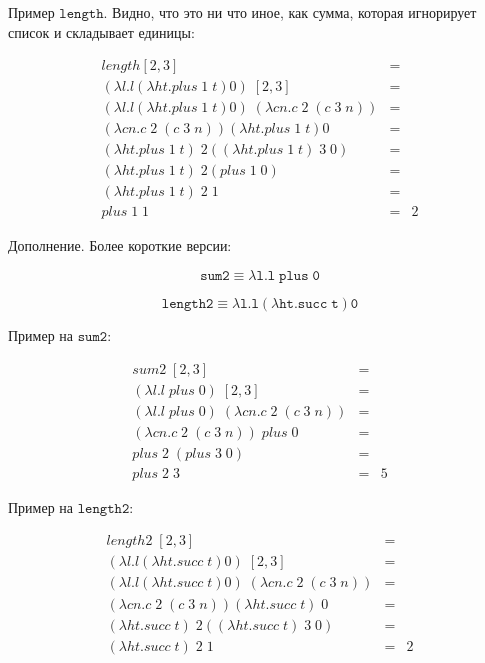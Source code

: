 \documentclass[russian]{article}
\begin{document}
Пример $\mathtt{length}$. Видно, что это ни что иное, как сумма, которая игнорирует список и складывает единицы:

\begin{eqnarray*}
length [2, 3] & =\\
(\lambda l.l(\lambda ht.plus\; 1\; t)0)\; [2, 3] &=\\
(\lambda l.l(\lambda ht.plus\; 1\; t)0)\; (\lambda cn.c\;2\;(c\;3\;n)) &=\\
(\lambda cn.c\;2\;(c\;3\;n))(\lambda ht.plus\; 1\; t)0 & =\\
(\lambda ht.plus\; 1\; t)\; 2((\lambda ht.plus\; 1\; t)\; 3\; 0) &=\\
(\lambda ht.plus\; 1\; t)\; 2(plus\; 1\; 0) &=\\
(\lambda ht.plus\; 1\; t)\; 2\; 1 &=\\
plus\; 1\; 1 &= &2
\end{eqnarray*}


Дополнение. Более короткие версии:

\[
\mathtt{sum2 \equiv \lambda l.l\;plus\;0}
\]

\[
\mathtt{length2 \equiv \lambda l.l(\lambda ht.succ\; t)0}
\]

Пример на $\mathtt{sum2}$:

\begin{eqnarray*}
sum2\; [2, 3] & =\\
(\lambda l.l\; plus\;0)\; [2, 3] &=\\
(\lambda l.l\; plus\;0)\; (\lambda cn.c\;2\;(c\;3\;n)) &=\\
(\lambda cn.c\;2\;(c\;3\;n))\;plus\;0 & =\\
plus\; 2\;(plus\;3\;0) & = \\
plus\; 2\; 3 &= &5
\end{eqnarray*}


Пример на $\mathtt{length2}$:

\begin{eqnarray*}
length2\; [2, 3] & =\\
(\lambda l.l(\lambda ht.succ\; t)0)\; [2, 3] &=\\
(\lambda l.l(\lambda ht.succ\; t)0)\; (\lambda cn.c\;2\;(c\;3\;n)) &=\\
(\lambda cn.c\;2\;(c\;3\;n))(\lambda ht.succ\; t)\;0 & =\\
(\lambda ht.succ\; t)\; 2((\lambda ht.succ\; t)\; 3\; 0) &=\\
(\lambda ht.succ\; t)\; 2\;1 &= & 2
\end{eqnarray*}
\end{document}
